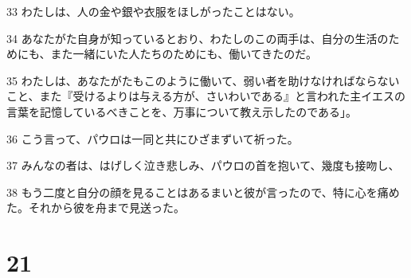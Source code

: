 \par 33 わたしは、人の金や銀や衣服をほしがったことはない。
\par 34 あなたがた自身が知っているとおり、わたしのこの両手は、自分の生活のためにも、また一緒にいた人たちのためにも、働いてきたのだ。
\par 35 わたしは、あなたがたもこのように働いて、弱い者を助けなければならないこと、また『受けるよりは与える方が、さいわいである』と言われた主イエスの言葉を記憶しているべきことを、万事について教え示したのである」。
\par 36 こう言って、パウロは一同と共にひざまずいて祈った。
\par 37 みんなの者は、はげしく泣き悲しみ、パウロの首を抱いて、幾度も接吻し、
\par 38 もう二度と自分の顔を見ることはあるまいと彼が言ったので、特に心を痛めた。それから彼を舟まで見送った。

\chapter{21}

